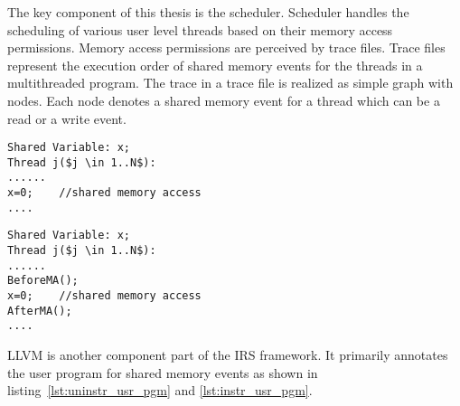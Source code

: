 The key component of this thesis is the scheduler. 
Scheduler handles the scheduling of various user level threads based on their memory access permissions. 
Memory access permissions are perceived by trace files. 
Trace files represent the execution order of shared memory events for the threads in a multithreaded program.  
The trace in a trace file is realized as simple graph with nodes. 
Each node denotes a shared memory event for a thread which can be a read or a write event. 
\\
\noindent\begin{minipage}{.45\textwidth}
\begin{lstlisting}[mathescape=true,style=customc,caption={Uninstrumented User Program},frame=tlrb,label={lst:uninstr_usr_pgm}]
Shared Variable: x;
Thread j($j \in 1..N$): 
......
x=0;	//shared memory access
....
\end{lstlisting}
\end{minipage}\hfill
\begin{minipage}{.45\textwidth}
\begin{lstlisting}[mathescape=true,style=customc,caption={Instrumented User Program},frame=tlrb,label={lst:instr_usr_pgm}]
Shared Variable: x;
Thread j($j \in 1..N$): 
......
BeforeMA();
x=0;	//shared memory access
AfterMA();
....
\end{lstlisting}
\end{minipage}

LLVM is another component part of the IRS framework. 
It primarily annotates the user program for shared memory events as shown in listing~\ref{lst:uninstr_usr_pgm} and \ref{lst:instr_usr_pgm}. 

